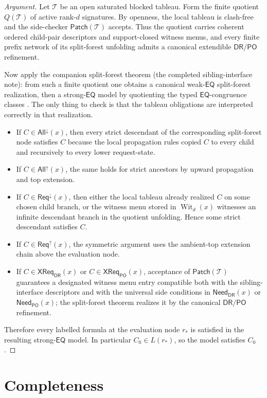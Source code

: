 \documentclass[11pt]{article}
\theoremstyle{remark}
\newcommand{\DR}{\mathsf{DR}}
\newcommand{\PO}{\mathsf{PO}}
\newcommand{\EQ}{\mathsf{EQ}}
\newcommand{\Wit}{\operatorname{Wit}}
\newcommand{\ReqUp}{\mathsf{Req}^{\uparrow}}
\newcommand{\ReqDown}{\mathsf{Req}^{\downarrow}}
\newcommand{\AllUp}{\mathsf{All}^{\uparrow}}
\newcommand{\AllDown}{\mathsf{All}^{\downarrow}}
\newcommand{\CrossDR}{\mathsf{XReq}_{\DR}}
\newcommand{\CrossPO}{\mathsf{XReq}_{\PO}}
\newcommand{\NeedDR}{\mathsf{Need}_{\DR}}
\newcommand{\NeedPO}{\mathsf{Need}_{\PO}}
\begin{document}
\begin{proof}[Argument]
Let $\mathcal T$ be an open saturated blocked tableau. Form the finite quotient $Q(\mathcal T)$ of active rank-$d$ signatures. By openness, the local tableau is clash-free and the side-checker $\mathsf{Patch}(\mathcal T)$ accepts. Thus the quotient carries coherent ordered child-pair descriptors and support-closed witness menus, and every finite prefix network of its split-forest unfolding admits a canonical extendible $\DR/\PO$ refinement.

Now apply the companion split-forest theorem (the completed sibling-interface note): from such a finite quotient one obtains a canonical weak-$\EQ$ split-forest realization, then a strong-$\EQ$ model by quotienting the typed $\EQ$-congruence classes \cite{SiblingCompleted}. The only thing to check is that the tableau obligations are interpreted correctly in that realization.
\begin{itemize}
    \item If $C\in \AllDown(x)$, then every strict descendant of the corresponding split-forest node satisfies $C$ because the local propagation rules copied $C$ to every child and recursively to every lower request-state.
    \item If $C\in \AllUp(x)$, the same holds for strict ancestors by upward propagation and top extension.
    \item If $C\in \ReqDown(x)$, then either the local tableau already realized $C$ on some chosen child branch, or the witness menu stored in $\Wit_d(x)$ witnesses an infinite descendant branch in the quotient unfolding. Hence some strict descendant satisfies $C$.
    \item If $C\in \ReqUp(x)$, the symmetric argument uses the ambient-top extension chain above the evaluation node.
    \item If $C\in \CrossDR(x)$ or $C\in \CrossPO(x)$, acceptance of $\mathsf{Patch}(\mathcal T)$ guarantees a designated witness menu entry compatible both with the sibling-interface descriptors and with the universal side conditions in $\NeedDR(x)$ or $\NeedPO(x)$; the split-forest theorem realizes it by the canonical $\DR/\PO$ refinement.
\end{itemize}
Therefore every labelled formula at the evaluation node $r_\ast$ is satisfied in the resulting strong-$\EQ$ model. In particular $C_0\in L(r_\ast)$, so the model satisfies $C_0$.
\end{proof}

\section{Completeness}
\end{document}
